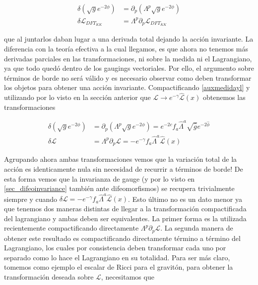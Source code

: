 \documentclass{article}
\numberwithin{equation}{section}
\begin{document}
\begin{equation}\label{auxmedidayl}
\begin{aligned}
\delta \left( \sqrt{g} e^{-2 \phi} \right) &= \partial_p \left( \Lambda^p \sqrt{g} e^{-2 \phi}\right)\\
\delta \mathcal{L}_{DFT_{KK}} &= \Lambda^p \partial_p \mathcal{L}_{DFT_{KK}}
\end{aligned}
\end{equation}

que al juntarlos daban lugar a una derivada total dejando la acción invariante. La diferencia con la teoría efectiva a la cual llegamos, es que ahora no tenemos más derivadas parciales en las transformaciones, ni sobre la medida ni el Lagrangiano, ya que todo quedó dentro de los gaugings vectoriales. Por ello, el argumento sobre términos de borde no será válido y es necesario observar como deben transformar los objetos para obtener una acción invariante. Compactificando \ref{auxmedidayl} y utilizando por lo visto en la sección anterior que $ \mathcal{L} \longrightarrow e^{- \gamma} \hat{\mathcal{L}}(x) $ obtenemos las transformaciones

\begin{equation}
\begin{aligned}
\delta \left( \sqrt{g} e^{-2 \phi} \right) &= \partial_p \left( \Lambda^p \sqrt{g} e^{-2 \phi}\right) = e^{-2 c} f_a \hat{\Lambda}^a \sqrt{\hat{g}} e^{-2 \hat{\phi}} \\
\delta \mathcal{L} &= \Lambda^p \partial_p \mathcal{L} = - e^{- \gamma} f_a \hat{\Lambda}^a \hat{\mathcal{L}}(x)
\end{aligned}
\end{equation}

Agrupando ahora ambas transformaciones vemos que la variación total de la acción es identicamente nula sin necesidad de recurrir a términos de borde! De esta forma vemos que la invarianza de gauge (y por lo visto en \ref{sec_difeoinvariance} también ante difeomorfismos) se recupera trivialmente siempre y cuando $ \delta \mathcal{L} = - e^{- \gamma} f_a \hat{\Lambda}^a \hat{\mathcal{L}}(x) $. Esto último no es un dato menor ya que tenemos dos maneras distintas de llegar a la transformación compactificada del lagrangiano y ambas deben ser equivalentes. La primer forma es la utilizada recientemente compactificando directamente $ \Lambda^p \partial_p \mathcal{L} $. La segunda manera de obtener este resultado es compactificando directamente término a término del Lagrangiano, los cuales por consistencia deben transformar cada uno por separado como lo hace el Lagrangiano en su totalidad. Para ser más claro, tomemos como ejemplo el escalar de Ricci para el gravitón, para obtener la transformación deseada sobre $ \mathcal{L} $, necesitamos que
\end{document}
